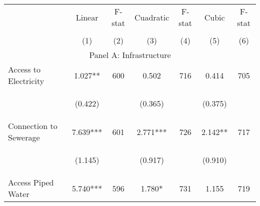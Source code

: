 \begin{tabular}{lcccccc}


\toprule


\multicolumn{1}{l}{} & \multicolumn{1}{c}{Linear} & \multicolumn{1}{c}{F-stat} & \multicolumn{1}{c}{Cuadratic} & \multicolumn{1}{c}{F-stat} & \multicolumn{1}{c}{Cubic} & \multicolumn{1}{c}{F-stat}  \\

\cmidrule(l{1mm}r{1mm}){2-3} \cmidrule(l{1mm}r{1mm}){4-5} \cmidrule(l{1mm}r{1mm}){6-7}   \\

 & (1) & (2) & (3) & (4) & (5) & (6)  \\ 
 

\hline

\multicolumn{7}{c}{Panel A: Infrastructure}   \\                                                          

Access to Electricity   	&  1.027**   
				&  600  
				&   0.502  
				&  716 
				&  0.414  
				&  705 \\

\vspace{4pt} &  \begin{footnotesize}(0.422)\end{footnotesize}   & &
			    \begin{footnotesize}(0.365)\end{footnotesize}   & &
			    \begin{footnotesize}(0.375)\end{footnotesize}   & \\          


Connection to Sewerage   &  7.639***   &  601  &   2.771***  &  726 &  2.142**  &  717   \\

\vspace{4pt} &  \begin{footnotesize}(1.145)\end{footnotesize}   & &
			    \begin{footnotesize}(0.917)\end{footnotesize}   & &
			    \begin{footnotesize}(0.910)\end{footnotesize}   &
			     \\          


Access Piped Water   &  5.740***   &  596  &   1.780*  &  731 &  1.155  &  719   \\



\end{tabular}
